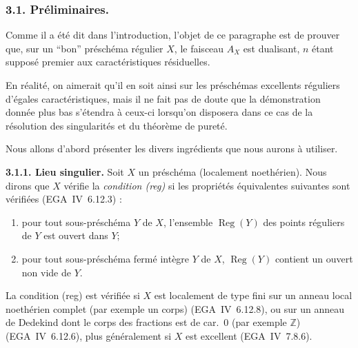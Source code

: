 \documentclass[11pt]{article}
\DeclareMathOperator{\Reg}{Reg}
\newcommand{\Z}{\mathbb{Z}}
\providecommand{\Z}{\mathbb Z}
\begin{document}
\subsubsection{3.1. Préliminaires.}

Comme il a été dit dans l'introduction, l'objet de ce paragraphe est de prouver que, sur un ``bon'' préschéma régulier $X$, le faisceau $A_X$ est dualisant, $n$ étant supposé premier aux caractéristiques résiduelles.

En réalité, on aimerait qu'il en soit ainsi sur les préschémas excellents réguliers d'égales caractéristiques, mais il ne fait pas de doute que la démonstration donnée plus bas s'étendra à ceux-ci lorsqu'on disposera dans ce cas de la résolution des singularités et du théorème de pureté.

Nous allons d'abord présenter les divers ingrédients que nous aurons à utiliser.

\textbf{3.1.1. Lieu singulier.} Soit $X$ un préschéma (localement noethérien). Nous dirons que $X$ vérifie la \emph{condition (reg)} si les propriétés équivalentes suivantes sont vérifiées (EGA~IV~6.12.3) :
\begin{enumerate}
\item[(i)] pour tout sous-préschéma $Y$ de $X$, l'ensemble $\Reg(Y)$ des points réguliers de $Y$ est ouvert dans $Y$;
\item[(ii)] pour tout sous-préschéma fermé intègre $Y$ de $X$, $\Reg(Y)$ contient un ouvert non vide de $Y$.
\end{enumerate}

La condition (reg) est vérifiée si $X$ est localement de type fini sur un anneau local noethérien complet (par exemple un corps) (EGA~IV~6.12.8), ou sur un anneau de Dedekind dont le corps des fractions est de car.~0 (par exemple $\Z$) (EGA~IV~6.12.6), plus généralement si $X$ est excellent (EGA~IV~7.8.6).
\end{document}
